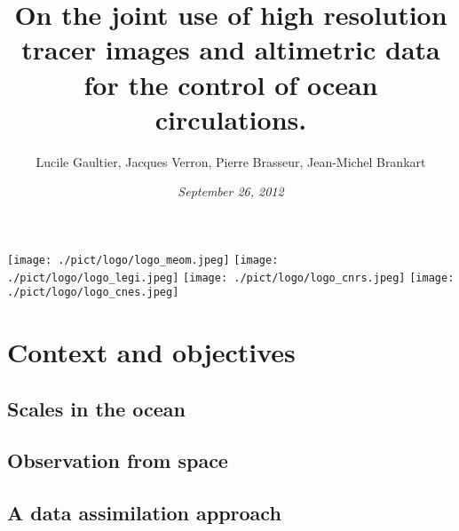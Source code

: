 \documentclass[compress,slidescentered,notes=show]{beamer}
\title{On the joint use of high resolution tracer images \hspace{4cm} and altimetric data for the control of ocean circulations.}
\author[LPO]{Lucile Gaultier, Jacques Verron, Pierre Brasseur, Jean-Michel Brankart}
\date{\textit{September 26, 2012}}
\begin{document}
\begin{frame}
  \maketitle
{}
  \begin{center}
    \texttt{[image: ./pict/logo/logo\_meom.jpeg]}
    \hspace{0.5cm}
    \texttt{[image: ./pict/logo/logo\_legi.jpeg]}
    \hspace{0.5cm}
    \texttt{[image: ./pict/logo/logo\_cnrs.jpeg]}
    \hspace{0.5cm}
    \texttt{[image: ./pict/logo/logo\_cnes.jpeg]}
  \end{center}

  \note{
}
\end{frame}

\logo{\insertframenumber/\inserttotalframenumber}

\section{Context and objectives}
        \subsection{Scales in the ocean}
\begin{frame}

\end{frame}

	\subsection[Observation]{Observation from space}
\begin{frame}
\end{frame}

	\subsection{A data assimilation approach}
\begin{frame}
\end{frame}
\end{document}
